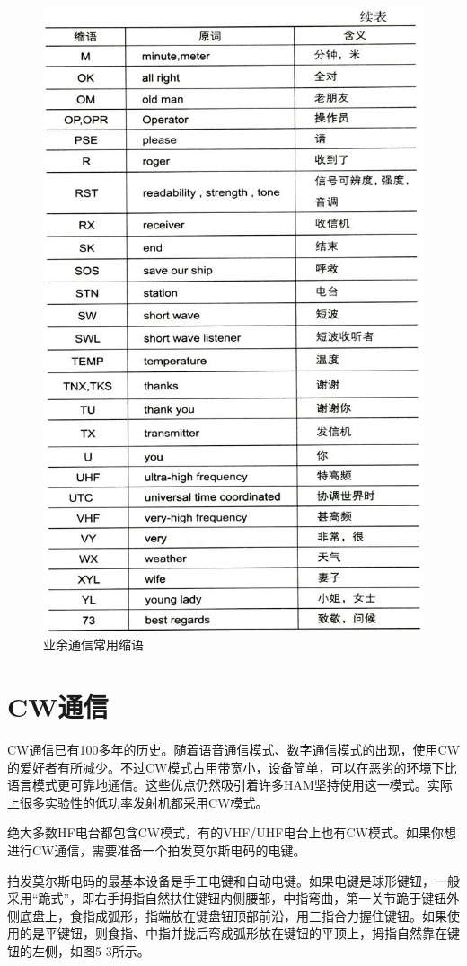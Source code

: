 \documentclass[12pt,UTF8]{ctexbook}
\begin{document}
\begin{figure}[htbp]
	\centering
	\includegraphics[width=0.7\linewidth]{66}
	\caption{业余通信常用缩语}
	\label{fig:1}
\end{figure}

\section{CW通信}

CW通信已有100多年的历史。随着语音通信模式、数字通信模式的出现，使用CW的爱好者有所减少。不过CW模式占用带宽小，设备简单，可以在恶劣的环境下比语言模式更可靠地通信。这些优点仍然吸引着许多HAM坚持使用这一模式。实际上很多实验性的低功率发射机都采用CW模式。

绝大多数HF电台都包含CW模式，有的VHF/UHF电台上也有CW模式。如果你想进行CW通信，需要准备一个拍发莫尔斯电码的电键。

拍发莫尔斯电码的最基本设备是手工电键和自动电键。如果电键是球形键钮，一般采用“跪式”，即右手拇指自然扶住键钮内侧腰部，中指弯曲，第一关节跪于键钮外侧底盘上，食指成弧形，指端放在键盘钮顶部前沿，用三指合力握住键钮。如果使用的是平键钮，则食指、中指并拢后弯成弧形放在键钮的平顶上，拇指自然靠在键钮的左侧，如图5-3所示。
\end{document}
